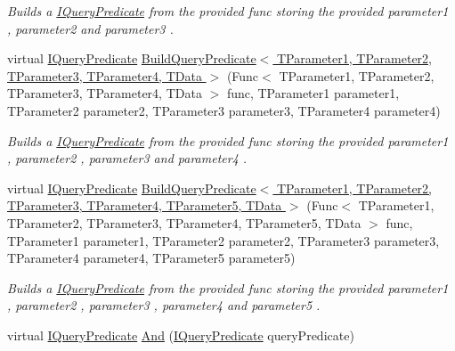 \begin{DoxyCompactItemize}
\begin{DoxyCompactList}\small\item\em Builds a \hyperlink{interfaceCqrs_1_1Repositories_1_1Queries_1_1IQueryPredicate}{I\+Query\+Predicate} from the provided {\itshape func}  storing the provided {\itshape parameter1} , {\itshape parameter2}  and {\itshape parameter3} . \end{DoxyCompactList}\item 
virtual \hyperlink{interfaceCqrs_1_1Repositories_1_1Queries_1_1IQueryPredicate}{I\+Query\+Predicate} \hyperlink{classCqrs_1_1Repositories_1_1Queries_1_1QueryStrategy_a554a686b6f81c4b8337570b9a4e0c284_a554a686b6f81c4b8337570b9a4e0c284}{Build\+Query\+Predicate$<$ T\+Parameter1, T\+Parameter2, T\+Parameter3, T\+Parameter4, T\+Data $>$} (Func$<$ T\+Parameter1, T\+Parameter2, T\+Parameter3, T\+Parameter4, T\+Data $>$ func, T\+Parameter1 parameter1, T\+Parameter2 parameter2, T\+Parameter3 parameter3, T\+Parameter4 parameter4)
\begin{DoxyCompactList}\small\item\em Builds a \hyperlink{interfaceCqrs_1_1Repositories_1_1Queries_1_1IQueryPredicate}{I\+Query\+Predicate} from the provided {\itshape func}  storing the provided {\itshape parameter1} , {\itshape parameter2} , {\itshape parameter3}  and {\itshape parameter4} . \end{DoxyCompactList}\item 
virtual \hyperlink{interfaceCqrs_1_1Repositories_1_1Queries_1_1IQueryPredicate}{I\+Query\+Predicate} \hyperlink{classCqrs_1_1Repositories_1_1Queries_1_1QueryStrategy_a78a10741d78134a528b6e159a5b72401_a78a10741d78134a528b6e159a5b72401}{Build\+Query\+Predicate$<$ T\+Parameter1, T\+Parameter2, T\+Parameter3, T\+Parameter4, T\+Parameter5, T\+Data $>$} (Func$<$ T\+Parameter1, T\+Parameter2, T\+Parameter3, T\+Parameter4, T\+Parameter5, T\+Data $>$ func, T\+Parameter1 parameter1, T\+Parameter2 parameter2, T\+Parameter3 parameter3, T\+Parameter4 parameter4, T\+Parameter5 parameter5)
\begin{DoxyCompactList}\small\item\em Builds a \hyperlink{interfaceCqrs_1_1Repositories_1_1Queries_1_1IQueryPredicate}{I\+Query\+Predicate} from the provided {\itshape func}  storing the provided {\itshape parameter1} , {\itshape parameter2} , {\itshape parameter3} , {\itshape parameter4}  and {\itshape parameter5} . \end{DoxyCompactList}\item 
virtual \hyperlink{interfaceCqrs_1_1Repositories_1_1Queries_1_1IQueryPredicate}{I\+Query\+Predicate} \hyperlink{classCqrs_1_1Repositories_1_1Queries_1_1QueryStrategy_a860b209d9e99d7de5302ef4e19d318f0_a860b209d9e99d7de5302ef4e19d318f0}{And} (\hyperlink{interfaceCqrs_1_1Repositories_1_1Queries_1_1IQueryPredicate}{I\+Query\+Predicate} query\+Predicate)

\end{DoxyCompactItemize}
